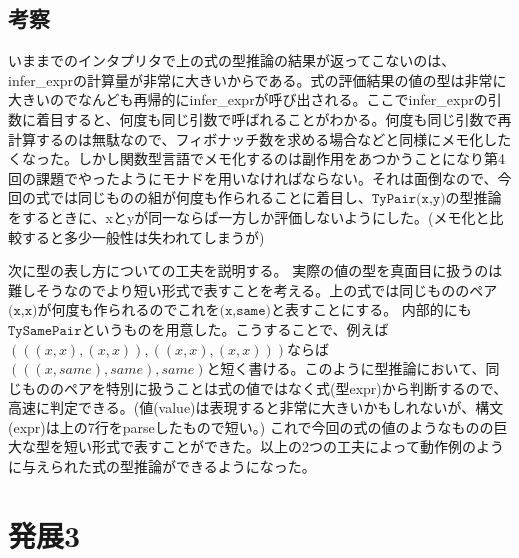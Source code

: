 \documentclass[11pt,a4paper]{jsarticle}
\begin{document}
\subsection*{考察}
いままでのインタプリタで上の式の型推論の結果が返ってこないのは、infer\_exprの計算量が非常に大きいからである。式の評価結果の値の型は非常に大きいのでなんども再帰的にinfer\_exprが呼び出される。ここでinfer\_exprの引数に着目すると、何度も同じ引数で呼ばれることがわかる。何度も同じ引数で再計算するのは無駄なので、フィボナッチ数を求める場合などと同様にメモ化したくなった。しかし関数型言語でメモ化するのは副作用をあつかうことになり第4回の課題でやったようにモナドを用いなければならない。それは面倒なので、今回の式では同じものの組が何度も作られることに着目し、$\texttt{TyPair(x,y)}$の型推論をするときに、xとyが同一ならば一方しか評価しないようにした。(メモ化と比較すると多少一般性は失われてしまうが)\par
次に型の表し方についての工夫を説明する。
実際の値の型を真面目に扱うのは難しそうなのでより短い形式で表すことを考える。上の式では同じもののペア$\texttt{(x,x)}$が何度も作られるのでこれを$\texttt{(x,same)}$と表すことにする。
内部的にも$\texttt{TySamePair}$というものを用意した。こうすることで、例えば$(((x,x),(x,x)),((x,x),(x,x)))$ならば$(((x,same),same),same)$と短く書ける。このように型推論において、同じもののペアを特別に扱うことは式の値ではなく式(型expr)から判断するので、高速に判定できる。(値(value)は表現すると非常に大きいかもしれないが、構文(expr)は上の7行をparseしたもので短い。)
これで今回の式の値のようなものの巨大な型を短い形式で表すことができた。以上の2つの工夫によって動作例のように与えられた式の型推論ができるようになった。
\section*{発展3}
\end{document}
